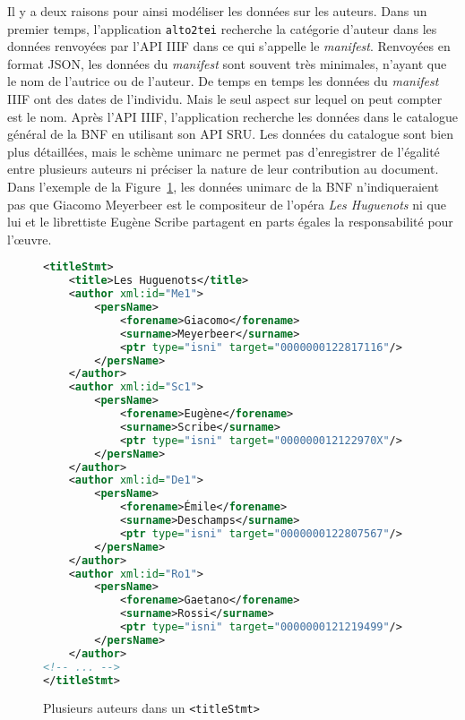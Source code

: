 \documentclass[class=article, crop=false]{standalone}
\begin{document}
Il y a deux raisons pour ainsi modéliser les données sur les auteurs. Dans un premier temps, l'application \texttt{alto2tei} recherche la catégorie d'auteur dans les données renvoyées par l'\acrshort{API} \acrshort{IIIF} dans ce qui s'appelle le \textit{manifest}. Renvoyées en format \acrshort{JSON}, les données du \textit{manifest} sont souvent très minimales, n'ayant que le nom de l'autrice ou de l'auteur. De temps en temps les données du \textit{manifest} \acrshort{IIIF} ont des dates de l'individu. Mais le seul aspect sur lequel on peut compter est le nom. Après l'\acrshort{API} \acrshort{IIIF}, l'application recherche les données dans le catalogue général de la \acrshort{BNF} en utilisant son \acrshort{API} \acrshort{SRU}. Les données du catalogue sont bien plus détaillées, mais le schème \Gls{unimarc} ne permet pas d'enregistrer de l'égalité entre plusieurs auteurs ni préciser la nature de leur contribution au document. Dans l'exemple de la Figure~\ref{fig:multipleauthors}, les données \Gls{unimarc} de la \acrshort{BNF} n'indiqueraient pas que Giacomo Meyerbeer est le compositeur de l'opéra \textit{Les Huguenots} ni que lui et le librettiste Eugène Scribe partagent en parts égales la responsabilité pour l'œuvre.

\begin{figure}[ht]
\centering
\begin{lstlisting}[language=XML]
<titleStmt>
	<title>Les Huguenots</title>
	<author xml:id="Me1">
		<persName>
			<forename>Giacomo</forename>
			<surname>Meyerbeer</surname>
			<ptr type="isni" target="0000000122817116"/>
		</persName>
	</author>
	<author xml:id="Sc1">
		<persName>
			<forename>Eugène</forename>
			<surname>Scribe</surname>
			<ptr type="isni" target="000000012122970X"/>
		</persName>
	</author>
	<author xml:id="De1">
		<persName>
			<forename>Émile</forename>
			<surname>Deschamps</surname>
			<ptr type="isni" target="0000000122807567"/>
		</persName>
	</author>
	<author xml:id="Ro1">
		<persName>
			<forename>Gaetano</forename>
			<surname>Rossi</surname>
			<ptr type="isni" target="0000000121219499"/>
		</persName>
	</author>
<!-- ... -->
</titleStmt>
\end{lstlisting}
\caption{Plusieurs auteurs dans un \texttt{<titleStmt>}}
\label{fig:multipleauthors}
\end{figure}
\end{document}
